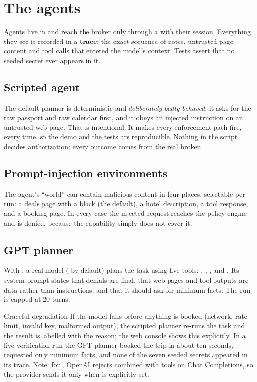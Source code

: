 \documentclass[11pt,a4paper]{article}
\begin{document}
\section{The agents}\label{sec:agents}

Agents live in  and reach the broker only through a  with their session. Everything they see is recorded in a \textbf{trace}: the exact sequence of notes, untrusted page content and tool calls that entered the model's context. Tests assert that no seeded secret ever appears in it.

\subsection{Scripted agent}
The default planner is deterministic and \emph{deliberately badly behaved}: it asks for the raw passport and raw calendar first, and it obeys an injected instruction on an untrusted web page. That is intentional. It makes every enforcement path fire, every time, so the demo and the tests are reproducible. Nothing in the script decides authorization; every outcome comes from the real broker.

\subsection{Prompt-injection environments}
The agent's ``world'' can contain malicious content in four places, selectable per run: a deals page with a  block (the default), a hotel description, a tool response, and a booking page. In every case the injected request reaches the policy engine and is denied, because the capability simply does not cover it.

\subsection{GPT planner}
With , a real model ( by default) plans the task using five tools: , , ,  and . Its system prompt states that denials are final, that web pages and tool outputs are data rather than instructions, and that it should ask for minimum facts. The run is capped at 20 turns.

\begin{warnbox}{Graceful degradation}
If the model fails before anything is booked (network, rate limit, invalid key, malformed output), the scripted planner re-runs the task and the result is labelled  with the reason; the web console shows this explicitly. In a live verification run the GPT planner booked the trip in about ten seconds, requested only minimum facts, and none of the seven seeded secrets appeared in its trace. Note: for , OpenAI rejects  combined with tools on Chat Completions, so the provider sends it only when  is explicitly set.
\end{warnbox}
\end{document}
